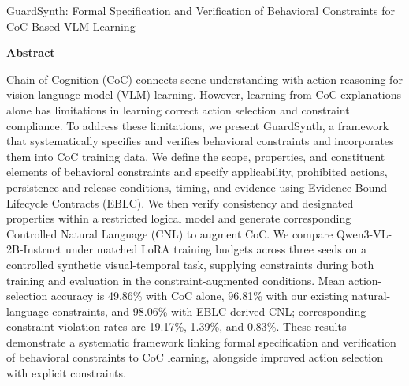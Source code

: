 \documentclass[11pt,a4paper]{article}
\begin{document}
\vspace*{8mm}
{\Large\bfseries\color{navy}\raggedright GuardSynth: Formal Specification and Verification of Behavioral Constraints for CoC-Based VLM Learning\par}
\vspace{8mm}
{\large\bfseries Abstract\par}
\vspace{3mm}
Chain of Cognition (CoC) connects scene understanding with action reasoning for vision-language model (VLM) learning. However, learning from CoC explanations alone has limitations in learning correct action selection and constraint compliance. To address these limitations, we present GuardSynth, a framework that systematically specifies and verifies behavioral constraints and incorporates them into CoC training data. We define the scope, properties, and constituent elements of behavioral constraints and specify applicability, prohibited actions, persistence and release conditions, timing, and evidence using Evidence-Bound Lifecycle Contracts (EBLC). We then verify consistency and designated properties within a restricted logical model and generate corresponding Controlled Natural Language (CNL) to augment CoC. We compare Qwen3-VL-2B-Instruct under matched LoRA training budgets across three seeds on a controlled synthetic visual-temporal task, supplying constraints during both training and evaluation in the constraint-augmented conditions. Mean action-selection accuracy is 49.86\% with CoC alone, 96.81\% with our existing natural-language constraints, and 98.06\% with EBLC-derived CNL; corresponding constraint-violation rates are 19.17\%, 1.39\%, and 0.83\%. These results demonstrate a systematic framework linking formal specification and verification of behavioral constraints to CoC learning, alongside improved action selection with explicit constraints.
\end{document}
